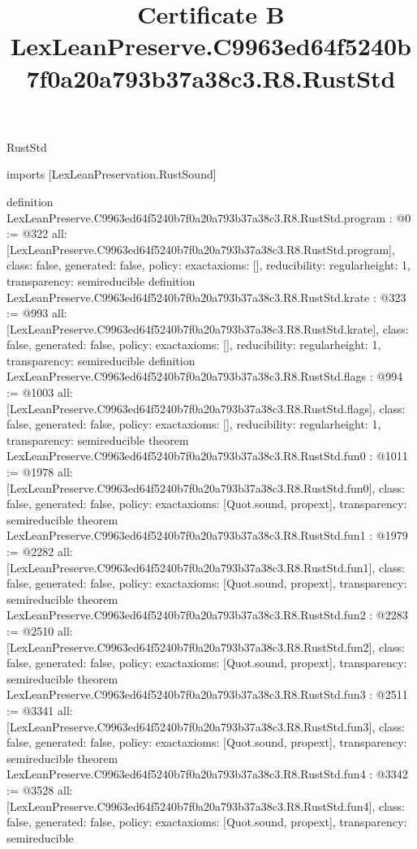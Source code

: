\begin{lexlean}{RustStd}
\title{Certificate B LexLeanPreserve.C9963ed64f5240b7f0a20a793b37a38c3.R8.RustStd}
\begin{coremodule}
imports [LexLeanPreservation.RustSound]

definition LexLeanPreserve.C9963ed64f5240b7f0a20a793b37a38c3.R8.RustStd.program : @0 := @322 {
  all: [LexLeanPreserve.C9963ed64f5240b7f0a20a793b37a38c3.R8.RustStd.program],
  class: false,
  generated: false,
  policy: exact{axioms: []},
  reducibility: regular{height: 1},
  transparency: semireducible
}
definition LexLeanPreserve.C9963ed64f5240b7f0a20a793b37a38c3.R8.RustStd.krate : @323 := @993 {
  all: [LexLeanPreserve.C9963ed64f5240b7f0a20a793b37a38c3.R8.RustStd.krate],
  class: false,
  generated: false,
  policy: exact{axioms: []},
  reducibility: regular{height: 1},
  transparency: semireducible
}
definition LexLeanPreserve.C9963ed64f5240b7f0a20a793b37a38c3.R8.RustStd.flags : @994 := @1003 {
  all: [LexLeanPreserve.C9963ed64f5240b7f0a20a793b37a38c3.R8.RustStd.flags],
  class: false,
  generated: false,
  policy: exact{axioms: []},
  reducibility: regular{height: 1},
  transparency: semireducible
}
theorem LexLeanPreserve.C9963ed64f5240b7f0a20a793b37a38c3.R8.RustStd.fun0 : @1011 := @1978 {
  all: [LexLeanPreserve.C9963ed64f5240b7f0a20a793b37a38c3.R8.RustStd.fun0],
  class: false,
  generated: false,
  policy: exact{axioms: [Quot.sound, propext]},
  transparency: semireducible
}
theorem LexLeanPreserve.C9963ed64f5240b7f0a20a793b37a38c3.R8.RustStd.fun1 : @1979 := @2282 {
  all: [LexLeanPreserve.C9963ed64f5240b7f0a20a793b37a38c3.R8.RustStd.fun1],
  class: false,
  generated: false,
  policy: exact{axioms: [Quot.sound, propext]},
  transparency: semireducible
}
theorem LexLeanPreserve.C9963ed64f5240b7f0a20a793b37a38c3.R8.RustStd.fun2 : @2283 := @2510 {
  all: [LexLeanPreserve.C9963ed64f5240b7f0a20a793b37a38c3.R8.RustStd.fun2],
  class: false,
  generated: false,
  policy: exact{axioms: [Quot.sound, propext]},
  transparency: semireducible
}
theorem LexLeanPreserve.C9963ed64f5240b7f0a20a793b37a38c3.R8.RustStd.fun3 : @2511 := @3341 {
  all: [LexLeanPreserve.C9963ed64f5240b7f0a20a793b37a38c3.R8.RustStd.fun3],
  class: false,
  generated: false,
  policy: exact{axioms: [Quot.sound, propext]},
  transparency: semireducible
}
theorem LexLeanPreserve.C9963ed64f5240b7f0a20a793b37a38c3.R8.RustStd.fun4 : @3342 := @3528 {
  all: [LexLeanPreserve.C9963ed64f5240b7f0a20a793b37a38c3.R8.RustStd.fun4],
  class: false,
  generated: false,
  policy: exact{axioms: [Quot.sound, propext]},
  transparency: semireducible
}
\end{coremodule}
\end{lexlean}
